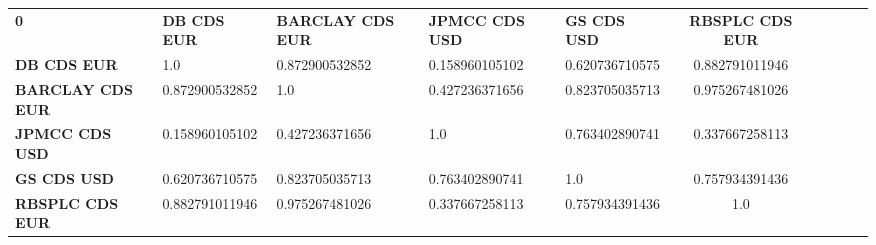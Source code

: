 \begin{center}
 \begin{tabular}{|l|l|l|l|l|c|c|c|c|c|}
\hline
\textbf{0} & \textbf{DB CDS EUR} & \textbf{BARCLAY CDS EUR} & \textbf{JPMCC CDS USD} & \textbf{GS CDS USD} & \textbf{RBSPLC CDS EUR}\\\hhline{|=|=|=|=|=|=|}
\textbf{DB CDS EUR} & 1.0 & 0.872900532852 & 0.158960105102 & 0.620736710575 & 0.882791011946\\
\textbf{BARCLAY CDS EUR} & 0.872900532852 & 1.0 & 0.427236371656 & 0.823705035713 & 0.975267481026\\
\textbf{JPMCC CDS USD} & 0.158960105102 & 0.427236371656 & 1.0 & 0.763402890741 & 0.337667258113\\
\textbf{GS CDS USD} & 0.620736710575 & 0.823705035713 & 0.763402890741 & 1.0 & 0.757934391436\\
\textbf{RBSPLC CDS EUR} & 0.882791011946 & 0.975267481026 & 0.337667258113 & 0.757934391436 & 1.0\\
\hline
\end{tabular}
\end{center}